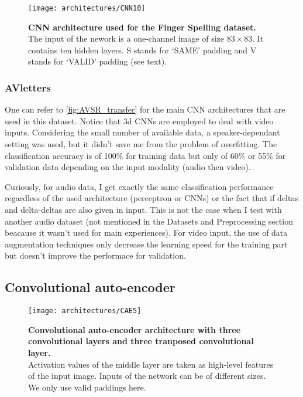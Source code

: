 \begin{figure}[H]
  \centering
  \texttt{[image: architectures/CNN10]}\\[-1.5em]
  \caption{%
    \textbf{CNN architecture used for the Finger Spelling  dataset.}
      \\[0.1em]
    The input of the nework is a one-channel image of size $83 \times 83$.
      It contains ten hidden layers. S stands for `SAME' padding
      and V stands for `VALID' padding (see text).}
  \label{fig:CNN10}
\end{figure}

\subsubsection{AVletters}

One can refer to \autoref{fig:AVSR_transfer} for the main CNN architectures
that are used in this dataset. 
Notice that 3d CNNs are employed to deal with video inputs.
Considering the small number of available data, a speaker-dependant
setting was used, but it didn't save me from the problem of overfitting.
The classification accuracy is of 100\% for training data but only
of 60\% or 55\% for validation data depending on the input modality
(audio then video).

Curiously, for audio data, I get exactly the same classification
performance regardless of the used architecture (perceptron or CNNs)
or the fact that if deltas and delta-deltas are also given in input.
This is not the case when I test with another audio dataset
(not mentioned in the Datasets and Preprocessing section beacause
it wasn't used for main experiences).
For video input, the use of data augmentation techniques only decrease
the learning speed for the training part but doesn't improve the performace
for validation.

\subsection{Convolutional auto-encoder} \label{subsection:CAE}

\begin{figure}[H]
  \centering
  \texttt{[image: architectures/CAE5]}\\[-2.5em]
  \caption{%
    \textbf{Convolutional auto-encoder architecture with 
      three convolutional layers and three tranposed convolutional
      layer.}\\[0.1em]
    Activation values of the middle layer are taken as 
      high-level features of the input image. Inputs of the network
      can be of different sizes. We only use valid paddings here.}
  \label{fig:CAE5}
\end{figure}

